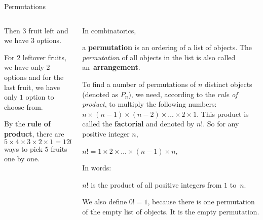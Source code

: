 \documentclass[9pt,aspectratio=169]{beamer}
\begin{document}
\begin{frame}{Permutations}
\begin{columns}[T]
\begin{column}{0.5\textwidth}
      Then $3$ fruit left and we have $3$ options. 
      
      For $2$ leftover fruits, we have only $2$ options and for the last fruit, we have only $1$ option to choose from.

      By the \textbf{rule of product}, there are
      \[5 \times 4 \times 3 \times 2 \times 1 = 120\]
      ways to pick $5$ fruits one by one. 
    \end{column}
    \begin{column}{0.5\textwidth}
      In combinatorics, 
      \begin{definition}
        a \textbf{permutation} is an ordering of a list of objects. The \emph{permutation} of all objects in the list is also called \mbox{an \textbf{arrangement}}.
      \end{definition}
      To find a number of permutations of $n$ distinct objects (denoted as $P_n$), we need, according to the \emph{rule of product}, to multiply the following numbers: $n \times (n − 1) \times (n − 2) \times \ldots \times 2 \times 1$.
      This product is called the \textbf{factorial} and denoted by $n!$. So for any positive integer $n$,
      \begin{definition}
        \centering $n! = 1 \times 2 \times \ldots \times (n − 1) \times n,$
      \end{definition} 
      In words:
      \begin{example}
        $n!$ is the product of all positive integers from $1$ to~$n$.
      \end{example}

      We also define $0! = 1$, because there is one permutation of the empty list of objects. It is the empty permutation. 
    \end{column}
  \end{columns}
\end{frame}
\end{document}
